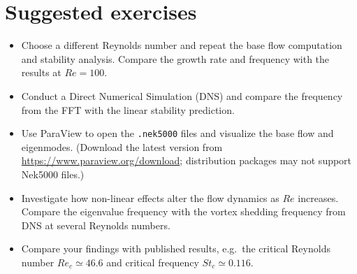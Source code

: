 \documentclass{article}
\begin{document}
\section*{Suggested exercises}
\begin{itemize}
\item Choose a different Reynolds number and repeat the base flow computation and stability analysis. Compare the growth rate and frequency with the results at $Re=100$.
\item Conduct a Direct Numerical Simulation (DNS) and compare the frequency from the FFT with the linear stability prediction.
\item Use ParaView to open the \texttt{.nek5000} files and visualize the base flow and eigenmodes. (Download the latest version from \url{https://www.paraview.org/download}; distribution packages may not support Nek5000 files.)
\item Investigate how non-linear effects alter the flow dynamics as $Re$ increases. Compare the eigenvalue frequency with the vortex shedding frequency from DNS at several Reynolds numbers.
\item Compare your findings with published results, e.g.\ the critical Reynolds number $Re_c \simeq 46.6$ and critical frequency $St_c \simeq 0.116$.
\end{itemize}
\end{document}

